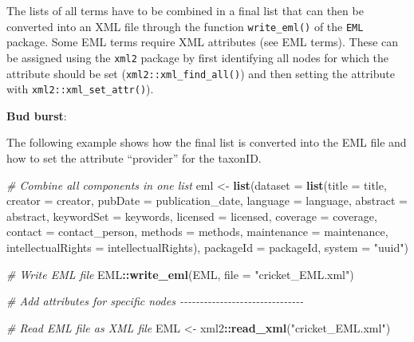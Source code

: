 \documentclass[
]{book}
\newenvironment{Shaded}{\begin{snugshade}}{\end{snugshade}}
\newcommand{\AttributeTok}[1]{\textcolor[rgb]{0.13,0.29,0.53}{#1}}
\newcommand{\CommentTok}[1]{\textcolor[rgb]{0.56,0.35,0.01}{\textit{#1}}}
\newcommand{\FunctionTok}[1]{\textcolor[rgb]{0.13,0.29,0.53}{\textbf{#1}}}
\newcommand{\NormalTok}[1]{#1}
\newcommand{\OtherTok}[1]{\textcolor[rgb]{0.56,0.35,0.01}{#1}}
\newcommand{\SpecialCharTok}[1]{\textcolor[rgb]{0.81,0.36,0.00}{\textbf{#1}}}
\newcommand{\StringTok}[1]{\textcolor[rgb]{0.31,0.60,0.02}{#1}}
\begin{document}
The lists of all terms have to be combined in a final list that can then be converted into an XML file through the function \texttt{write\_eml()} of the \texttt{EML} package.
Some EML terms require XML attributes (see EML terms). These can be assigned using the \texttt{xml2} package by first identifying all nodes for which the attribute should be set (\texttt{xml2::xml\_find\_all()}) and then setting the attribute with \texttt{xml2::xml\_set\_attr()}).

\textbf{Bud burst}:

The following example shows how the final list is converted into the EML file and how to set the attribute ``provider'' for the taxonID.

\begin{Shaded}
\begin{Highlighting}[]
\CommentTok{\# Combine all components in one list}
\NormalTok{eml }\OtherTok{\textless{}{-}} \FunctionTok{list}\NormalTok{(}\AttributeTok{dataset =}
              \FunctionTok{list}\NormalTok{(}\AttributeTok{title =}\NormalTok{ title,}
                   \AttributeTok{creator =}\NormalTok{ creator,}
                   \AttributeTok{pubDate =}\NormalTok{ publication\_date,}
                   \AttributeTok{language =}\NormalTok{ language,}
                   \AttributeTok{abstract =}\NormalTok{ abstract,}
                   \AttributeTok{keywordSet =}\NormalTok{ keywords,}
                   \AttributeTok{licensed =}\NormalTok{ licensed,}
                   \AttributeTok{coverage =}\NormalTok{ coverage,}
                   \AttributeTok{contact =}\NormalTok{ contact\_person,}
                   \AttributeTok{methods =}\NormalTok{ methods,}
                   \AttributeTok{maintenance =}\NormalTok{ maintenance,}
                   \AttributeTok{intellectualRights =}\NormalTok{ intellectualRights),}
            \AttributeTok{packageId =}\NormalTok{ packageId, }
            \AttributeTok{system =} \StringTok{"uuid"}\NormalTok{)}

\CommentTok{\# Write EML file}
\NormalTok{EML}\SpecialCharTok{::}\FunctionTok{write\_eml}\NormalTok{(EML, }\AttributeTok{file =} \StringTok{"cricket\_EML.xml"}\NormalTok{)          }


\CommentTok{\# Add attributes for specific nodes {-}{-}{-}{-}{-}{-}{-}{-}{-}{-}{-}{-}{-}{-}{-}{-}{-}{-}{-}{-}{-}{-}{-}{-}{-}{-}{-}{-}{-}{-}{-}}

\CommentTok{\# Read EML file as XML file}
\NormalTok{EML }\OtherTok{\textless{}{-}}\NormalTok{ xml2}\SpecialCharTok{::}\FunctionTok{read\_xml}\NormalTok{(}\StringTok{"cricket\_EML.xml"}\NormalTok{)}


\end{Highlighting}
\end{Shaded}
\end{document}
